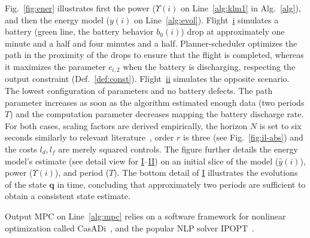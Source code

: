\documentclass[letterpaper,10pt,journal,twoside]{IEEEtran}
\theoremstyle{definition}
\begin{document}
Fig.~\ref{fig:ener} %
illustrates first the power ($\Upsilon(i)$ on Line~\ref{alg:klm1} in Alg.~\ref{alg}), and then the energy model ($y(i)$ on Line~\ref{alg:evol}).
Flight~\hyperref[fig:ener-dyn-i]{i} simulates a battery (green line, the battery behavior $b_0(i)$) drop at approximately one minute and a half and four minutes and a half. Planner-scheduler optimizes the path in the proximity of the drops to ensure that the flight is completed, whereas it maximizes the parameter $c_{i,2}$ when the battery is discharging, respecting the output constraint (Def.~\ref{def:const}). Flight~\hyperref[fig:ener-dyn-ii]{ii} simulates the opposite scenario. The lowest configuration of parameters and no battery defects. The path parameter increases as soon as the algorithm estimated enough data (two periods $T$) and the computation parameter decreases mapping the battery discharge rate. For both cases, scaling factors are derived empirically, the horizon $N$ is set to six seconds similarly to relevant literature~\cite{gavilan2015iterative,kang2009linear,stastny2018nonlinear,chao2011collision}, order $r$ is three (see Fig.~\ref{fig:il-abs}) and the costs $l_d,l_f$ are merely squared controls.
The figure further details the energy model's estimate (see detail view for \hyperref[fig:ener:static-I]{I}--\hyperref[fig:ener:static-II]{II}) on an initial slice of the model (${\hat{y}}(i)$), power ($\Upsilon(i)$), and period ($T$). %
The bottom detail of \hyperref[fig:ener:static-I]{I} illustrates the evolutions of the state $\mathbf{q}$ in time, concluding that approximately two periods are sufficient to obtain a consistent state estimate. %

Output MPC on Line~\ref{alg:mpc} relies on a software framework for nonlinear optimization called CasADi~\cite{andersson2012casadi,andersson2012bcasadi,andersson2019casadi}, and the popular NLP solver IPOPT~\cite{wachter2006implementation}.
\end{document}
